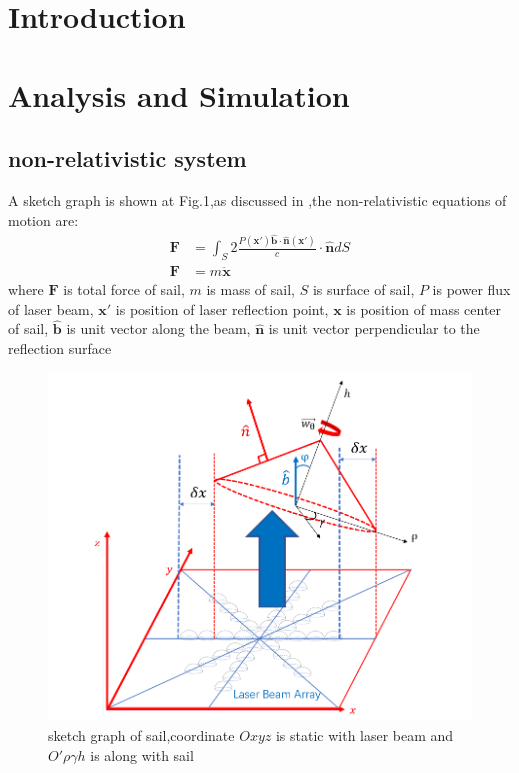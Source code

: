 \documentclass{article}
\begin{document}
\section{Introduction}
\section{Analysis and Simulation}
\subsection{non-relativistic system}

A sketch graph is shown at Fig.1,as discussed in \cite{},the non-relativistic equations of motion are:
\begin{align}
\boldsymbol{F} &= \int_S 2\frac{P( \boldsymbol{x'})\hat{\boldsymbol{b}}\cdot\hat{\boldsymbol{n}}(\boldsymbol{x'})}{c}\cdot\hat{\boldsymbol{n}}dS \\
\boldsymbol{F} &= m\boldsymbol{\ddot{x}}
\end{align}
where $\boldsymbol{F}$ is total force of sail, $m$ is mass of sail, $S$ is surface of sail, $P$ is power flux of laser beam, $\boldsymbol{x'}$ is position of laser reflection point, $\boldsymbol{x}$ is position of mass center of sail, $\hat{\boldsymbol{b}}$ is unit vector along the beam, $\hat{\boldsymbol{n}}$ is unit vector perpendicular to the reflection surface\\
\begin{figure}[htpb]
	\centering
	\includegraphics[scale=0.3]{scheme.png}
	\caption{sketch graph of sail,coordinate $Oxyz$ is static with laser beam and $O'\rho\gamma h$ is along with sail}
\end{figure}
\end{document}
